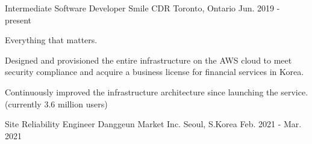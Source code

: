 

\begin{cventries}

  \cventry
    {Intermediate Software Developer} %
    {Smile CDR} %
    {Toronto, Ontario} %
    {Jun. 2019 - present} %
    {
      \begin{cvitems} %
        \item {Everything that matters.}
        \item {Designed and provisioned the entire infrastructure on the AWS cloud to meet security compliance and acquire a business license for financial services in Korea.}
        \item {Continuously improved the infrastructure architecture since launching the service. (currently 3.6 million users)}
      \end{cvitems}
    }

  \cventry
    {Site Reliability Engineer} %
    {Danggeun Market Inc.} %
    {Seoul, S.Korea} %
    {Feb. 2021 - Mar. 2021} %
    {
    }


\end{cventries}

